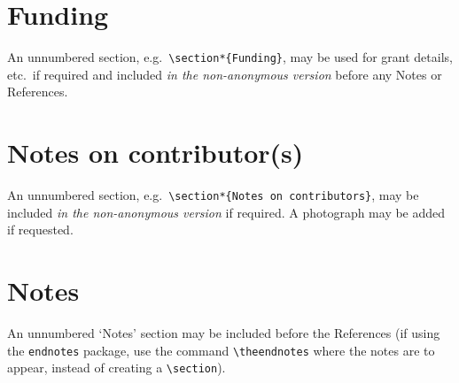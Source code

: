 \documentclass[]{interact}
\theoremstyle{plain}%
\theoremstyle{definition}
\theoremstyle{remark}
\begin{document}
\section*{Funding}

An unnumbered section, e.g.\ \verb"\section*{Funding}", may be used for grant details, etc.\ if required and included \emph{in the non-anonymous version} before any Notes or References.


\section*{Notes on contributor(s)}

An unnumbered section, e.g.\ \verb"\section*{Notes on contributors}", may be included \emph{in the non-anonymous version} if required. A photograph may be added if requested.


\section*{Notes}

An unnumbered `Notes' section may be included before the References (if using the \verb"endnotes" package, use the command \verb"\theendnotes" where the notes are to appear, instead of creating a \verb"\section").




\end{document}
